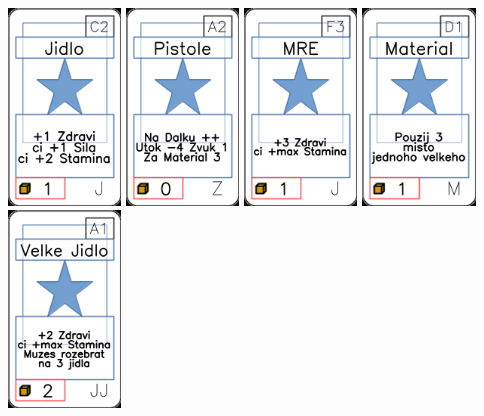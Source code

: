 \documentclass[a4paper]{article}
\begin{document}
	\includegraphics[width=3.0cm]{img-1_11}
	\includegraphics[width=3.0cm]{img-1_91}
	\includegraphics[width=3.0cm]{img-1_27}
	\includegraphics[width=3.0cm]{img-1_45}
	\includegraphics[width=3.0cm]{img-1_30}
\end{document}
